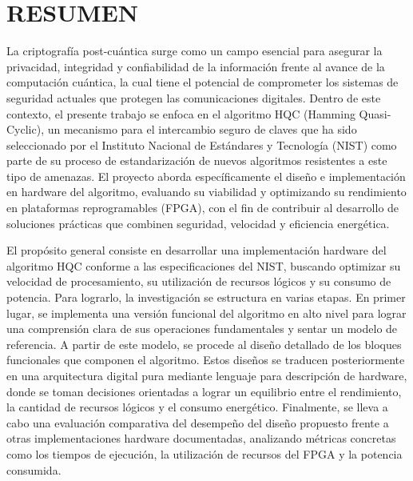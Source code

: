 \pagestyle{plain} %
\setcounter{page}{1}




\chapter*{RESUMEN}
La criptografía post-cuántica surge como un campo esencial para asegurar la privacidad, integridad y confiabilidad de la información frente al avance de la computación cuántica, la cual tiene el potencial de comprometer los sistemas de seguridad actuales que protegen las comunicaciones digitales. Dentro de este contexto, el presente trabajo se enfoca en el algoritmo HQC (Hamming Quasi-Cyclic), un mecanismo para el intercambio seguro de claves que ha sido seleccionado por el Instituto Nacional de Estándares y Tecnología (NIST) como parte de su proceso de estandarización de nuevos algoritmos resistentes a este tipo de amenazas. El proyecto aborda específicamente el diseño e implementación en hardware del algoritmo, evaluando su viabilidad y optimizando su rendimiento en plataformas reprogramables (FPGA), con el fin de contribuir al desarrollo de soluciones prácticas que combinen seguridad, velocidad y eficiencia energética.

El propósito general consiste en desarrollar una implementación hardware del algoritmo HQC conforme a las especificaciones del NIST, buscando optimizar su velocidad de procesamiento, su utilización de recursos lógicos y su consumo de potencia. Para lograrlo, la investigación se estructura en varias etapas. En primer lugar, se implementa una versión funcional del algoritmo en alto nivel para lograr una comprensión clara de sus operaciones fundamentales y sentar un modelo de referencia. A partir de este modelo, se procede al diseño detallado de los bloques funcionales que componen el algoritmo. Estos diseños se traducen posteriormente en una arquitectura digital pura mediante lenguaje para descripción de hardware, donde se toman decisiones orientadas a lograr un equilibrio entre el rendimiento, la cantidad de recursos lógicos y el consumo energético. Finalmente, se lleva a cabo una evaluación comparativa del desempeño del diseño propuesto frente a otras implementaciones hardware documentadas, analizando métricas concretas como los tiempos de ejecución, la utilización de recursos del FPGA y la potencia consumida.

